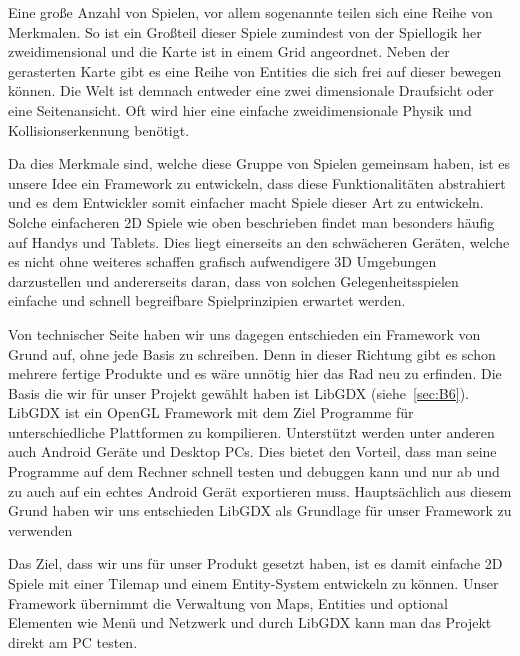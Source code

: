 Eine große Anzahl von Spielen, vor allem sogenannte  teilen sich eine Reihe von Merkmalen.
So ist ein Großteil dieser Spiele zumindest von der Spiellogik her zweidimensional und die Karte ist in einem Grid angeordnet. Neben der gerasterten Karte gibt es eine Reihe von Entities die sich frei auf dieser bewegen können. Die Welt ist demnach entweder eine zwei dimensionale Draufsicht oder eine Seitenansicht. Oft wird hier eine einfache zweidimensionale Physik und Kollisionserkennung benötigt.

Da dies Merkmale sind, welche diese Gruppe von Spielen gemeinsam haben, ist es unsere Idee ein Framework zu entwickeln, dass diese Funktionalitäten abstrahiert und es dem Entwickler somit einfacher macht Spiele dieser Art zu entwickeln.
Solche einfacheren 2D Spiele wie oben beschrieben findet man besonders häufig auf Handys und Tablets. Dies liegt einerseits an den schwächeren Geräten, welche es nicht ohne weiteres schaffen grafisch aufwendigere 3D Umgebungen darzustellen und andererseits daran, dass von solchen Gelegenheitsspielen einfache und schnell begreifbare Spielprinzipien erwartet werden.

Von technischer Seite haben wir uns dagegen entschieden ein Framework von Grund auf, ohne jede Basis zu schreiben. Denn in dieser Richtung gibt es schon mehrere fertige Produkte und es wäre unnötig hier das Rad neu zu erfinden. 
Die Basis die wir für unser Projekt gewählt haben ist LibGDX (siehe~\ref{sec:B6}). LibGDX ist ein OpenGL Framework mit dem Ziel Programme für unterschiedliche Plattformen zu kompilieren. Unterstützt werden unter anderen auch Android Geräte und Desktop PCs. Dies bietet den Vorteil, dass man seine Programme auf dem Rechner schnell testen und debuggen kann und nur ab und zu auch auf ein echtes Android Gerät exportieren muss. Hauptsächlich aus diesem Grund haben wir uns entschieden LibGDX als Grundlage für unser Framework zu verwenden

Das Ziel, dass wir uns für unser Produkt gesetzt haben, ist es damit einfache 2D Spiele mit einer Tilemap und einem Entity-System entwickeln zu können. Unser Framework übernimmt die Verwaltung von Maps, Entities und optional Elementen wie Menü und Netzwerk und durch LibGDX kann man das Projekt direkt am PC testen.